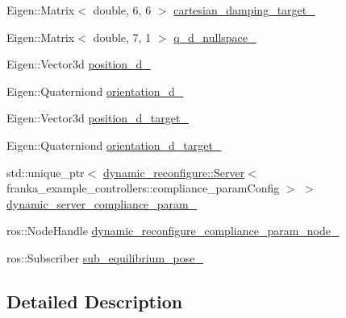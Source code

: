 \begin{DoxyCompactItemize}
\item 
Eigen\+::\+Matrix$<$ double, 6, 6 $>$ \hyperlink{classfranka__example__controllers_1_1CartesianImpedanceExampleController_afcb20af974815ddd883d1039ab554cc1}{cartesian\+\_\+damping\+\_\+target\+\_\+}
\item 
Eigen\+::\+Matrix$<$ double, 7, 1 $>$ \hyperlink{classfranka__example__controllers_1_1CartesianImpedanceExampleController_a17864b23083e90764168ceb4ea843df8}{q\+\_\+d\+\_\+nullspace\+\_\+}
\item 
Eigen\+::\+Vector3d \hyperlink{classfranka__example__controllers_1_1CartesianImpedanceExampleController_a7b1ed13a31a9561ced03a8a9221a303f}{position\+\_\+d\+\_\+}
\item 
Eigen\+::\+Quaterniond \hyperlink{classfranka__example__controllers_1_1CartesianImpedanceExampleController_a8528ed0cf7de6439e65bb1d4c4017137}{orientation\+\_\+d\+\_\+}
\item 
Eigen\+::\+Vector3d \hyperlink{classfranka__example__controllers_1_1CartesianImpedanceExampleController_a2d30d23bda9622c57d2e894cfd00cc37}{position\+\_\+d\+\_\+target\+\_\+}
\item 
Eigen\+::\+Quaterniond \hyperlink{classfranka__example__controllers_1_1CartesianImpedanceExampleController_ae2c7eed26db0a1b708b91148451bb13e}{orientation\+\_\+d\+\_\+target\+\_\+}
\item 
std\+::unique\+\_\+ptr$<$ \hyperlink{strikes__back_2servers_2led__action__server_2src_2led__action__server__node_8cpp_a2036ae39d23f8e14a2cc8ddcd46dea5a}{dynamic\+\_\+reconfigure\+::\+Server}$<$ franka\+\_\+example\+\_\+controllers\+::compliance\+\_\+param\+Config $>$ $>$ \hyperlink{classfranka__example__controllers_1_1CartesianImpedanceExampleController_a43319973f57653a9d64bdafbeea2cf03}{dynamic\+\_\+server\+\_\+compliance\+\_\+param\+\_\+}
\item 
ros\+::\+Node\+Handle \hyperlink{classfranka__example__controllers_1_1CartesianImpedanceExampleController_a5c360df35cb2e4e32b47746a40ed95b1}{dynamic\+\_\+reconfigure\+\_\+compliance\+\_\+param\+\_\+node\+\_\+}
\item 
ros\+::\+Subscriber \hyperlink{classfranka__example__controllers_1_1CartesianImpedanceExampleController_a0daa6df50687aeeea370bbf13ed61774}{sub\+\_\+equilibrium\+\_\+pose\+\_\+}
\end{DoxyCompactItemize}


\subsection{Detailed Description}


